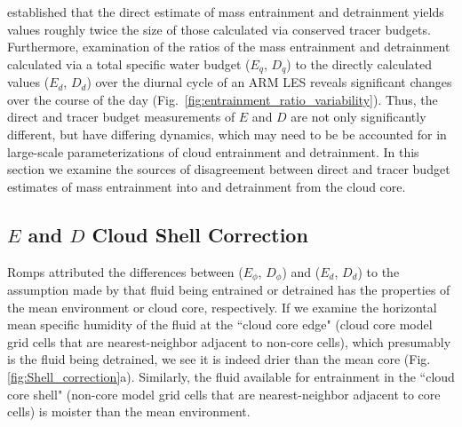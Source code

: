 \documentclass[12pt]{article}
\begin{document}
\cite{Romps2010} established that the direct estimate of mass entrainment 
and detrainment yields values roughly twice the size of those calculated 
via conserved tracer budgets.  Furthermore, examination of the ratios of 
the mass entrainment and detrainment calculated via a total specific 
water budget ($E_q$, $D_q$) to the directly calculated values 
($E_d$, $D_d$) over the diurnal cycle of an ARM LES reveals significant 
changes over the course of the day 
(Fig.~\ref{fig:entrainment_ratio_variability}).  Thus, the direct and 
tracer budget measurements of $E$ and $D$ are not only significantly
different, but have differing dynamics, which may need to be be accounted 
for in large-scale parameterizations of cloud entrainment and detrainment.  
In this section we examine the sources of disagreement between direct and 
tracer budget estimates of mass entrainment into and detrainment from the 
cloud core.


\subsection{$E$ and $D$ Cloud Shell Correction}

Romps attributed the differences between ($E_{\phi}$, $D_{\phi}$)
and ($E_d$, $D_d$) to the assumption made by \cite{Siebesma1995} that
fluid being entrained or detrained has the properties of the mean
environment or cloud core, respectively.  If we examine the horizontal 
mean specific humidity of the fluid at the ``cloud core edge" (cloud 
core model grid cells that are nearest-neighbor adjacent to non-core 
cells), which presumably is the fluid being detrained, we see it is 
indeed drier than the mean core (Fig. \ref{fig:Shell_correction}a).  
Similarly, the fluid available for entrainment in the ``cloud core shell" 
(non-core model grid cells that are nearest-neighbor adjacent to core 
cells) is moister than the mean environment.
\end{document}
